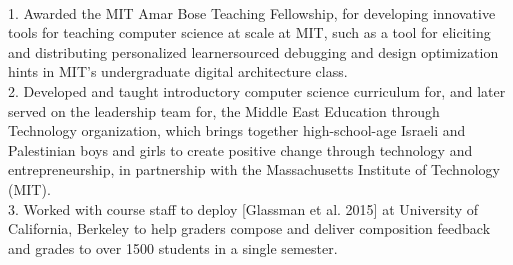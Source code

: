 \documentclass[11pt]{article}
\begin{document}
\\


1. Awarded the MIT Amar Bose Teaching Fellowship, for developing innovative tools for teaching computer science at scale at MIT, such as a tool for eliciting and distributing personalized learnersourced debugging and design optimization hints in MIT's undergraduate digital architecture class.\\[2pt]
2. Developed and taught introductory computer science curriculum for, and later served on the leadership team for, the Middle East Education through Technology organization, which brings together high-school-age Israeli and Palestinian boys and girls to create positive change through technology and entrepreneurship, in partnership with the Massachusetts Institute of Technology (MIT).\\[2pt]
3. Worked with course staff to deploy  [Glassman et al. 2015] at University of California, Berkeley to help graders compose and deliver composition feedback and grades to over 1500 students in a single semester.\\[2pt]
\end{document}
